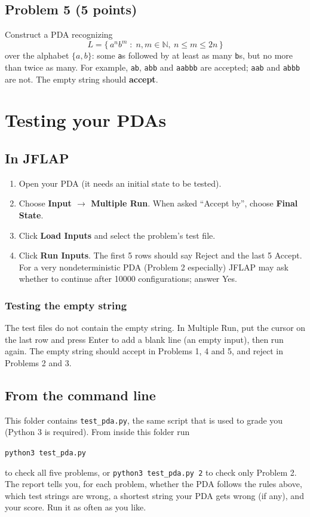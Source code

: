 \documentclass[11pt]{article}
\begin{document}
\subsection*{Problem 5 (5 points)}
Construct a PDA recognizing
\[
  L = \{\, a^n b^m \;:\; n, m \in \mathbb{N},\ n \le m \le 2n \,\}
\]
over the alphabet $\{a, b\}$: some \texttt{a}s followed by at least as many \texttt{b}s, but no
more than twice as many. For example, \texttt{ab}, \texttt{abb} and \texttt{aabbb} are accepted;
\texttt{aab} and \texttt{abbb} are not. The empty string should \textbf{accept}.

\section*{Testing your PDAs}

\subsection*{In JFLAP}
\begin{enumerate}
  \item Open your PDA (it needs an initial state to be tested).
  \item Choose \textbf{Input $\to$ Multiple Run}. When asked ``Accept by'', choose
        \textbf{Final State}.
  \item Click \textbf{Load Inputs} and select the problem's test file.
  \item Click \textbf{Run Inputs}. The first 5 rows should say Reject and the last 5 Accept.
        For a very nondeterministic PDA (Problem 2 especially) JFLAP may ask whether to continue
        after 10000 configurations; answer Yes.
\end{enumerate}

\subsubsection*{Testing the empty string}
The test files do not contain the empty string. In Multiple Run, put the cursor on the last row
and press Enter to add a blank line (an empty input), then run again. The empty string should
accept in Problems 1, 4 and 5, and reject in Problems 2 and 3.

\subsection*{From the command line}
This folder contains \texttt{test\_pda.py}, the same script that is used to grade you (Python 3
is required). From inside this folder run
\begin{center}
\texttt{python3 test\_pda.py}
\end{center}
to check all five problems, or \texttt{python3 test\_pda.py 2} to check only Problem 2. The
report tells you, for each problem, whether the PDA follows the rules above, which test strings
are wrong, a shortest string your PDA gets wrong (if any), and your score. Run it as often as you
like.
\end{document}
